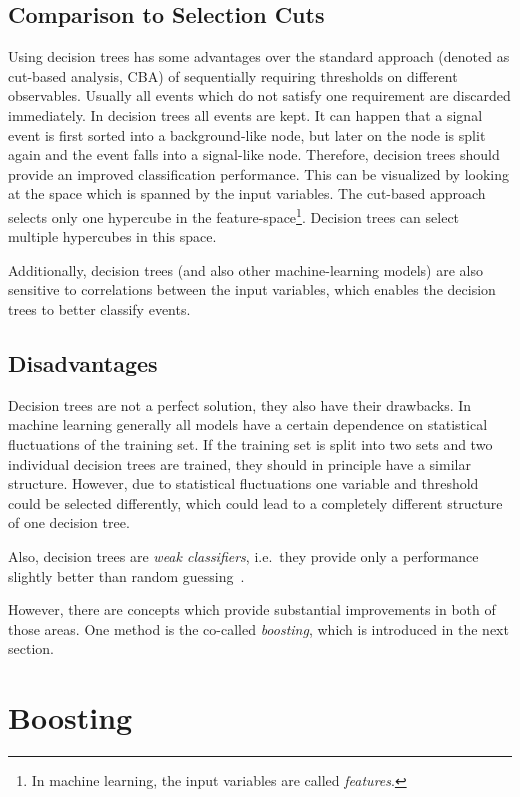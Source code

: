 \subsection{Comparison to Selection Cuts}\label{sub:bdt:dt:comparison}

Using decision trees has some advantages over the standard approach (denoted as cut-based analysis, CBA) of sequentially requiring thresholds on different
observables.
Usually all events which do not satisfy one requirement are discarded immediately.
In decision trees all events are kept.
It can happen that a signal event is first sorted into a background-like node, but later on the node is split again and
the event falls into a signal-like node.
Therefore, decision trees should provide an improved classification performance.
This can be visualized by looking at the space which is spanned by the input variables.
The cut-based approach selects only one hypercube in the
feature-space\footnote{In machine learning, the input variables are called \emph{features}.}.
Decision trees can select multiple hypercubes in this space.

Additionally, decision trees (and also other machine-learning models) are also sensitive to correlations
between the input variables, which enables the decision trees to better classify events.

\subsection{Disadvantages}\label{sub:bdt:dt:disadvantages}

Decision trees are not a perfect solution, they also have their drawbacks.
In machine learning generally all models have a certain dependence on statistical fluctuations of the training set.
If the training set is split into two sets and two individual decision trees are trained, they should in principle have
a similar structure.
However, due to statistical fluctuations one variable and threshold could be selected differently, which could lead
to a completely different structure of one decision tree.

Also, decision trees are \emph{weak classifiers}, i.e.\ they provide only a performance slightly better than random guessing~\cite{Hastie2009}.

However, there are concepts which provide substantial improvements in both of those areas.
One method is the co-called \emph{boosting}, which is introduced in the next section.

\section{Boosting}\label{sec:bdt:boosting}

